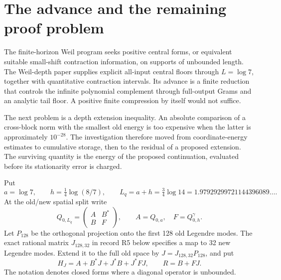 \documentclass[11pt]{article}
\theoremstyle{remark}\newtheorem{remark}[theorem]{Remark}
\begin{document}
\clearpage
\tableofcontents
\newpage
\section{The advance and the remaining proof problem}

The finite-horizon Weil program seeks positive central forms, or equivalent suitable small-shift contraction information, on supports of unbounded length. The Weil-depth paper supplies explicit all-input central floors through $L=\log7$, together with quantitative contraction intervals. Its advance is a finite reduction that controls the infinite polynomial complement through full-output Grams and an analytic tail floor. A positive finite compression by itself would not suffice.

The next problem is a depth extension inequality. An absolute comparison of a cross-block norm with the smallest old energy is too expensive when the latter is approximately $10^{-28}$. The investigation therefore moved from coordinate-energy estimates to cumulative storage, then to the residual of a proposed extension. The surviving quantity is the energy of the proposed continuation, evaluated before its stationarity error is charged.

Put
\begin{equation}\label{eq:depth}
 a=\log7,\qquad h=\tfrac14\log(8/7),\qquad
 L_q=a+h=\tfrac34\log14=1.97929299721144396089\ldots.
\end{equation}
At the old/new spatial split write
\[
 Q_{0,L_q}=\begin{pmatrix}A&B^*\\B&F\end{pmatrix},\qquad
 A=Q_{0,a},\quad F=Q^\gamma_{0,h}.
\]
Let $P_{128}$ be the orthogonal projection onto the first 128 old Legendre modes. The exact rational matrix $J_{128,32}$ in record R5 below specifies a map to 32 new Legendre modes. Extend it to the full old space by $J=J_{128,32}P_{128}$, and put
\begin{equation}\label{eq:HR}
 H_J=A+B^*J+J^*B+J^*FJ,\qquad R=B+FJ.
\end{equation}
The notation denotes closed forms where a diagonal operator is unbounded.
\end{document}
